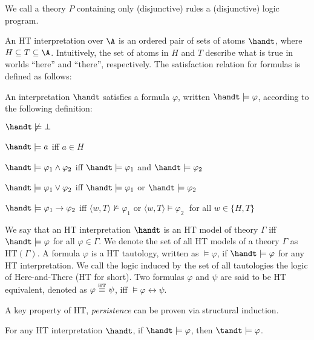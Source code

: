 We call a theory $P$ containing only (disjunctive) rules a
(disjunctive) logic program.

An HT interpretation over $\A$ is an ordered pair of sets of atoms
$\handt$, where $H \subseteq T \subseteq \A$. Intuitively, the set of
atoms in $H$ and $T$ describe what is true in worlds ``here'' and
``there'', respectively. The satisfaction relation for formulas is
defined as follows:

\begin{definition}[HT satisfaction]
    An interpretation $\handt$ satisfies a formula $\varphi$, written $\handt \models \varphi$, according to the following definition:
    \begin{description}
        \item $\handt \not \models \bot$
        \item $\handt \models a$ iff $a\in H$
        \item $\handt \models \varphi_1 \wedge \varphi_2$ iff $\handt \models \varphi_1$ and  $\handt \models \varphi_2$
        \item $\handt \models \varphi_1 \vee \varphi_2$ iff $\handt \models \varphi_1$ or  $\handt \models \varphi_2$
        \item $\handt \models \varphi_1 \to \varphi_2$ iff $\langle w,T \rangle \not \models \varphi_1$ or  $\langle w,T \rangle \models \varphi_2\;$ for all 
        $w \in \{H,T\}$
    \end{description}
\end{definition}

We say that an HT interpretation $\handt$ is an HT model of theory
$\Gamma$ iff $\handt \models \varphi$ for all $\varphi \in \Gamma$. We
denote the set of all HT models of a theory $\Gamma$ as
$\text{HT}(\Gamma)$. A formula $\varphi$ is a HT tautology, written as
$\models \varphi$, if $\handt \models \varphi$ for any HT
interpretation. We call the logic induced by the set of all
tautologies the logic of Here-and-There (HT for short). Two formulas
$\varphi$ and $\psi$ are said to be HT equivalent, denoted as
$\varphi \stackrel{\normalfont\mbox{\tiny HT}}{\equiv} \psi$, iff $\models \varphi \leftrightarrow \psi$.

A key property of HT, \textit{persistence} can be proven via
structural induction.

\begin{proposition}[Persistence]
  For any HT interpretation $\handt$, if $\handt \models \varphi$,
  then $\tandt \models \varphi$.
\end{proposition}

